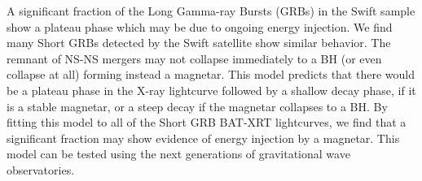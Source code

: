 


\bigskip



\bigskip

\noindent A significant fraction of the Long Gamma-ray Bursts (GRBs) in the Swift sample show a plateau phase which may be due to ongoing energy injection. We find many Short GRBs detected by the Swift satellite show similar behavior. The remnant of NS-NS mergers may not collapse immediately to a BH (or even collapse at all) forming instead a magnetar. This model predicts that there would be a plateau phase in the X-ray lightcurve followed by a shallow decay phase, if it is a stable magnetar, or a steep decay if the magnetar collapses to a BH. By fitting this model to all of the Short GRB BAT-XRT lightcurves, we find that a significant fraction may show evidence of energy injection by a magnetar. This model can be tested using the next generations of gravitational wave observatories.
